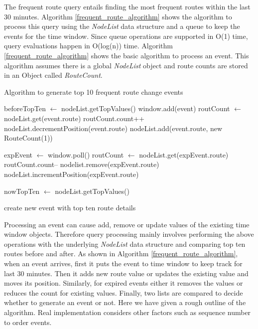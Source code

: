 The frequent route query entails finding the most frequent routes within the last 30 minutes. Algorithm \ref{frequent_route_algorithm} shows the algorithm to process this query using the \textit{NodeList} data structure and a queue to keep the events for the time window.  Since queue operations are supported in O(1) time, query evaluations happen in O(log(n)) time. Algorithm \ref{frequent_route_algorithm} shows the basic algorithm to process an event. This algorithm assumes there is a global \textit{NodeList} object and route counts are stored in an Object called \textit{RouteCount}. 

\begin{algorithm}
\caption{Algorithm to generate top 10 frequent route change events}
\label{frequent_route_algorithm}
\begin{algorithmic}
\small 
\STATE beforeTopTen $\leftarrow$ nodeList.getTopValues() 
\STATE window.add(event) 
	\STATE routCount $\leftarrow$ nodeList.get(event.route) 
	\STATE routCount.count++ 
	\STATE nodeList.decrementPosition(event.route) 
\ELSE
	\STATE nodeList.add(event.route, new RouteCount(1)) 
\ENDIF

	\STATE  expEvent $\leftarrow$ window.poll() 
	\STATE  routCount $\leftarrow$ nodeList.get(expEvent.route)
	\STATE  routCount.count-- 
		\STATE nodelist.remove(expEvent.route)
	\ELSE
		\STATE nodeList.incrementPosition(expEvent.route) 
	\ENDIF
\ENDWHILE

\STATE nowTopTen $\leftarrow$ nodeList.getTopValues() 

	\STATE create new event with top ten route details 
\ENDIF

\end{algorithmic}
\end{algorithm}

Processing an event can cause add, remove or update values of the existing time window objects. Therefore query processing mainly involves performing the above operations with the underlying \textit{NodeList} data structure and comparing top ten routes before and after. As shown in Algorithm \ref{frequent_route_algorithm}, when an event arrives, first it puts the event to time window to keep track for last 30 minutes. Then it adds new route value or updates the existing value and moves its position. Similarly, for expired events either it removes the values or reduces the count for existing values. Finally, two lists are compared to decide whether to generate an event or not. Here we have given a rough outline of the algorithm. Real implementation considers other factors such as sequence number to order events.

